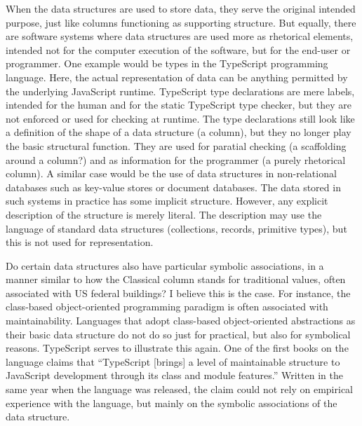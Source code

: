When the data structures are used to store data, they serve the original intended purpose,
just like columns functioning as supporting structure. But equally, there are software systems
where data structures are used more as rhetorical elements, intended not for the computer
execution of the software, but for the end-user or programmer. One example would be types
in the TypeScript programming language. Here, the actual representation of data can be anything
permitted by the underlying JavaScript runtime. TypeScript type declarations are mere labels,
intended for the human and for the static TypeScript type checker, but they are not enforced or
used for checking at runtime. The type declarations still look like a definition of the shape
of a data structure (a column), but they no longer play the basic structural function. They are
used for paratial checking (a scaffolding around a column?) and as information for the
programmer (a purely rhetorical column). A similar case would be the use of data structures
in non-relational databases such as key-value stores or document databases. The data stored
in such systems in practice has some implicit structure.  However, any explicit description
of the structure is merely literal. The description may use the language of standard data
structures (collections, records, primitive types), but this is not used for representation.

Do certain data structures also have particular symbolic associations, in a manner similar
to how the Classical column stands for traditional values, often associated with US federal
buildings? I believe this is the case. For instance, the class-based object-oriented
programming paradigm is often associated with maintainability. Languages that adopt
class-based object-oriented abstractions as their basic data structure do not do so
just for practical, but also for symbolical reasons. TypeScript serves to illustrate this
again. One of the first books on the language claims that ``TypeScript [brings] a level of
maintainable structure to JavaScript development through its class and module
features.'' Written in the same year when
the language was released, the claim could not rely on empirical experience with the language,
but mainly on the symbolic associations of the data structure.

